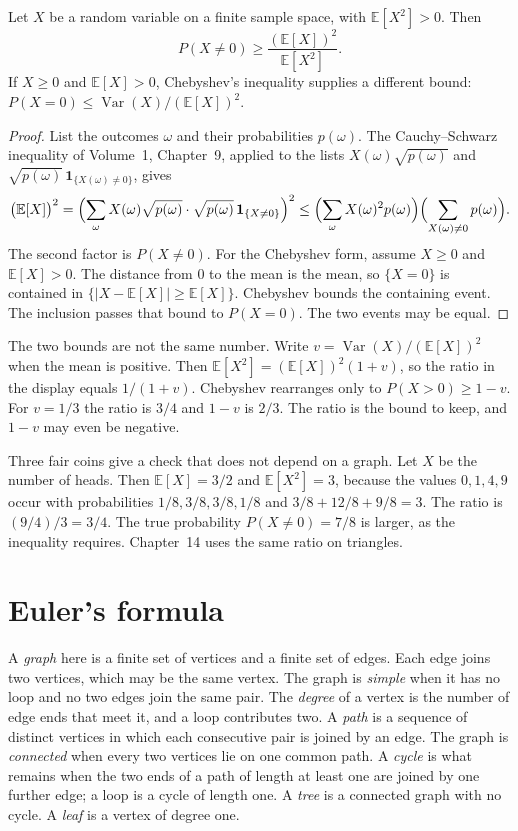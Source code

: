 \begin{proposition}\label{prop:second}
Let $X$ be a random variable on a finite sample space, with $\mathbb E[X^2]>0$. Then
\[
 P(X\ne0)\ge\frac{(\mathbb E[X])^2}{\mathbb E[X^2]}.
\]
If $X\ge0$ and $\mathbb E[X]>0$, Chebyshev's inequality supplies a different bound: $P(X=0)\le\operatorname{Var}(X)/(\mathbb E[X])^2$.
\end{proposition}
\begin{proof}
List the outcomes $\omega$ and their probabilities $p(\omega)$. The Cauchy--Schwarz inequality of Volume~1, Chapter~9, applied to the lists $X(\omega)\sqrt{p(\omega)}$ and $\sqrt{p(\omega)}\,\mathbf 1_{\{X(\omega)\ne0\}}$, gives
\[
 \bigl(\mathbb E[X]\bigr)^2
 =\Bigl(\sum_\omega X(\omega)\sqrt{p(\omega)}\cdot\sqrt{p(\omega)}\,\mathbf 1_{\{X\ne0\}}\Bigr)^2
 \le\Bigl(\sum_\omega X(\omega)^2 p(\omega)\Bigr)\Bigl(\sum_{X(\omega)\ne0}p(\omega)\Bigr).
\]
The second factor is $P(X\ne0)$. For the Chebyshev form, assume $X\ge0$ and $\mathbb E[X]>0$. The distance from $0$ to the mean is the mean, so $\{X=0\}$ is contained in $\{|X-\mathbb E[X]|\ge\mathbb E[X]\}$. Chebyshev bounds the containing event. The inclusion passes that bound to $P(X=0)$. The two events may be equal.
\end{proof}

The two bounds are not the same number. Write $v=\operatorname{Var}(X)/(\mathbb E[X])^2$ when the mean is positive. Then $\mathbb E[X^2]=(\mathbb E[X])^2(1+v)$, so the ratio in the display equals $1/(1+v)$. Chebyshev rearranges only to $P(X>0)\ge1-v$. For $v=1/3$ the ratio is $3/4$ and $1-v$ is $2/3$. The ratio is the bound to keep, and $1-v$ may even be negative.

Three fair coins give a check that does not depend on a graph. Let $X$ be the number of heads. Then $\mathbb E[X]=3/2$ and $\mathbb E[X^2]=3$, because the values $0,1,4,9$ occur with probabilities $1/8,3/8,3/8,1/8$ and $3/8+12/8+9/8=3$. The ratio is $(9/4)/3=3/4$. The true probability $P(X\ne0)=7/8$ is larger, as the inequality requires. Chapter~14 uses the same ratio on triangles.

\section{Euler's formula}

A \emph{graph} here is a finite set of vertices and a finite set of edges. Each edge joins two vertices, which may be the same vertex. The graph is \emph{simple} when it has no loop and no two edges join the same pair. The \emph{degree} of a vertex is the number of edge ends that meet it, and a loop contributes two. A \emph{path} is a sequence of distinct vertices in which each consecutive pair is joined by an edge. The graph is \emph{connected} when every two vertices lie on one common path. A \emph{cycle} is what remains when the two ends of a path of length at least one are joined by one further edge; a loop is a cycle of length one. A \emph{tree} is a connected graph with no cycle. A \emph{leaf} is a vertex of degree one.

